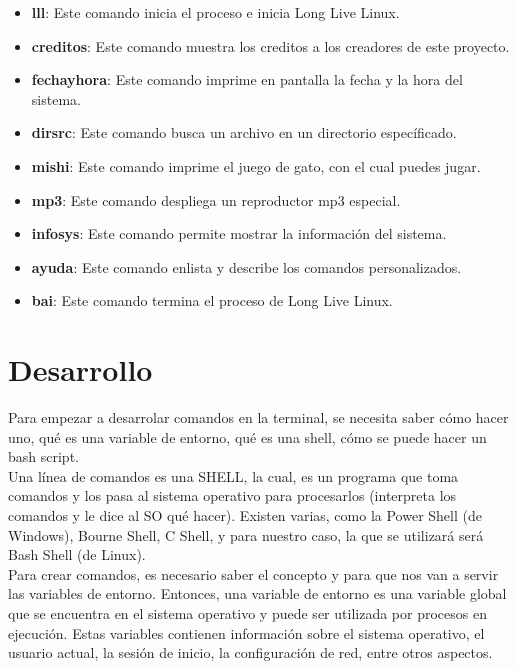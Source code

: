 \documentclass[titlepage]{article}
\begin{document}
\begin{itemize}
\item \textbf{lll}: Este comando inicia el proceso e inicia Long Live Linux.                          
\item \textbf{creditos}: Este comando muestra los creditos a los creadores de este proyecto.
\item \textbf{fechayhora}: Este comando imprime en pantalla la fecha y la hora del sistema. 
\item \textbf{dirsrc}: Este comando busca un archivo en un directorio específicado. 
\item \textbf{mishi}: Este comando imprime el juego de gato, con el cual puedes jugar. 
\item \textbf{mp3}: Este comando despliega un reproductor mp3 especial.               
\item \textbf{infosys}: Este comando permite mostrar la información del sistema.           
\item  \textbf{ayuda}: Este comando enlista y describe los comandos personalizados.     
\item \textbf{bai}: Este comando termina el proceso de Long Live Linux. 
\end{itemize}

\section{Desarrollo}

Para empezar a desarrolar comandos en la terminal, se necesita saber c\'omo hacer uno, qu\'e es una variable de entorno, qu\'e es una shell, c\'omo se puede hacer un bash script.\\

Una l\'inea de comandos es una SHELL, la cual, es un programa que toma comandos y los pasa al sistema operativo para procesarlos (interpreta los comandos y le dice al SO qu\'e hacer). Existen varias, como la Power Shell (de Windows), Bourne Shell, C Shell, y para nuestro caso, la que se utilizar\'a ser\'a Bash Shell (de Linux).\\

Para crear comandos, es necesario saber el concepto y para que nos van a servir las variables de entorno. Entonces, una variable de entorno es una variable global que se encuentra en el sistema operativo y puede ser utilizada por procesos en ejecución. Estas variables contienen información sobre el sistema operativo, el usuario actual, la sesión de inicio, la configuración de red, entre otros aspectos.\\
\end{document}
